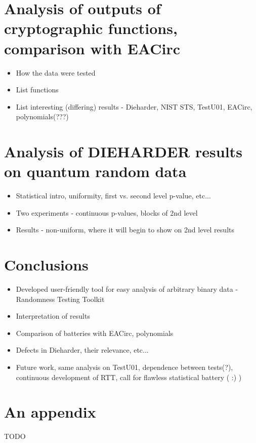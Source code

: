 \documentclass[
  digital,  	%
  color,		%
  oneside,   	%
  12pt,
  nocover,
  notable,
  nolof,
  nolot,
]{fithesis3}
\begin{document}
\chapter{Analysis of outputs of cryptographic functions, comparison with EACirc}
\begin{itemize}
\item How the data were tested
\item List functions
\item List interesting (differing) results - Dieharder, NIST STS, TestU01, EACirc, polynomials(???)
\end{itemize}

\chapter{Analysis of DIEHARDER results on quantum random data}
\begin{itemize}
\item Statistical intro, uniformity, first vs. second level p-value, etc...
\item Two experiments - continuous p-values, blocks of 2nd level
\item Results - non-uniform, where it will begin to show on 2nd level results
\end{itemize}

\chapter{Conclusions}
\begin{itemize}
\item Developed user-friendly tool for easy analysis of arbitrary binary data - Randomness Testing Toolkit
\item Interpretation of results
\item Comparison of batteries with EACirc, polynomials
\item Defects in Dieharder, their relevance, etc...
\item Future work, same analysis on TestU01, dependence between tests(?), continuous development of RTT, call for flawless statistical battery ( :) )
\end{itemize}

\appendix

\printbibliography

\chapter{An appendix}
\begin{huge}
TODO
\end{huge}
\end{document}
